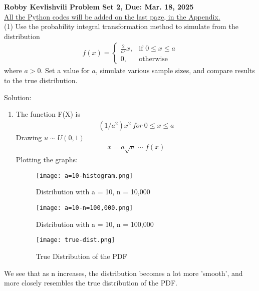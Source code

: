 \documentclass[final,11pt]{article}
\begin{document}
\thispagestyle{empty}
\begin{spacing}{1.25}

\textbf{Robby Kevlishvili \hfill Problem Set 2, Due: Mar. 18, 2025}\\

\underline{All the Python codes will be added on the last page, in the Appendix.} \\

(1) Use the probability integral transformation method to simulate from the distribution
\begin{gather}
    f(x) = 
    \begin{cases}
        \frac{2}{a^2}x,  & \text{if }0\leq x\leq a \\
        0, & \text{otherwise}
    \end{cases}
\end{gather}
where $a>0$. Set a value for $a$, simulate various sample sizes, and compare results to the true distribution.

{\color{blue}
Solution:
\begin{enumerate}
    \item The function F(X) is 
    \begin{gather}
        (1/a^2) x^2 \ for \ 0 \leq  x \leq a 
    \end{gather}
    Drawing $u \sim U(0,1)$ 
    \begin{gather}
        x=a\sqrt u \sim f(x)
    \end{gather}
    Plotting the graphs:
    \begin{figure} [H]
        \centering
        \texttt{[image: a=10-histogram.png]}
        \caption{Distribution with a = 10, n = 10,000}
        \label{fig:enter-label}
    \end{figure}
\begin{figure} [H]
    \centering
    \texttt{[image: a=10-n=100,000.png]}
    \caption{Distribution with a = 10, n = 100,000}
    \label{fig:enter-label}
\end{figure}
\begin{figure} [H]
    \centering
    \texttt{[image: true-dist.png]}
    \caption{True Distribution of the PDF}
    \label{fig:enter-label}
\end{figure}
\end{enumerate}
}

We see that as n increases, the distribution becomes a lot more 'smooth', and more closely resembles the true distribution of the PDF.


\end{spacing}
\end{document}
